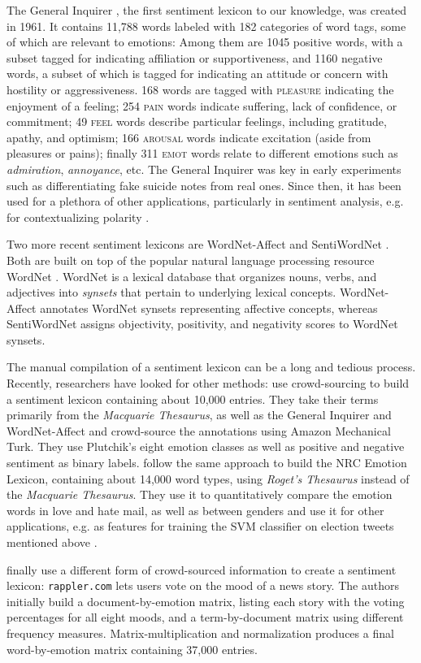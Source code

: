 The General Inquirer \cite{general_inquirer}, the first sentiment lexicon to our knowledge, was created in 1961. It contains 11,788 words labeled with 182 categories of word tags, some of which are relevant to emotions: Among them are 1045 positive words, with a subset tagged for indicating affiliation or supportiveness, and 1160 negative words, a subset of which is tagged for indicating an attitude or concern with hostility or aggressiveness. 168 words are tagged with \textsc{pleasure} indicating the enjoyment of a feeling; 254 \textsc{pain} words indicate suffering, lack of confidence, or commitment; 49 \textsc{feel} words describe particular feelings, including gratitude, apathy, and optimism; 166 \textsc{arousal} words indicate excitation (aside from pleasures or pains); finally 311 \textsc{emot} words relate to different emotions such as \textit{admiration}, \textit{annoyance}, etc. The General Inquirer was key in early experiments such as differentiating fake suicide notes from real ones. Since then, it has been used for a plethora of other applications, particularly in sentiment analysis, e.g. for contextualizing polarity \cite{general_inquirer_usage}. 

Two more recent sentiment lexicons are WordNet-Affect \cite{wordnet-affect} and SentiWordNet \cite{sentiwordnet}. Both are built on top of the popular natural language processing resource WordNet \cite{wordnet}. WordNet is a lexical database that organizes nouns, verbs, and adjectives into \textit{synsets} that pertain to underlying lexical concepts. WordNet-Affect annotates WordNet synsets representing affective concepts, whereas SentiWordNet assigns objectivity, positivity, and negativity scores to WordNet synsets.

The manual compilation of a sentiment lexicon can be a long and tedious process. Recently, researchers have looked for other methods: \citeauthor{nrc} use crowd-sourcing to build a sentiment lexicon containing about 10,000 entries. They take their terms primarily from the \textit{Macquarie Thesaurus}, as well as the General Inquirer and WordNet-Affect and crowd-source the annotations using Amazon Mechanical Turk. They use Plutchik's eight emotion classes as well as positive and negative sentiment as binary labels. \citeauthor{nrc_emolex} follow the same approach to build the NRC Emotion Lexicon, containing about 14,000 word types, using \textit{Roget's Thesaurus} instead of the \textit{Macquarie Thesaurus}. They use it to quantitatively compare the emotion words in love and hate mail, as well as between genders and use it for other applications, e.g. as features for training the SVM classifier on election tweets mentioned above \cite{semantic_role_labeling_tweets}.

\citeauthor{depechemood} finally use a different form of crowd-sourced information to create a sentiment lexicon: \texttt{rappler.com} lets users  vote on the mood of a news story. The authors initially build a document-by-emotion matrix, listing each story with the voting percentages for all eight moods, and a term-by-document matrix using different frequency measures. Matrix-multiplication and normalization produces a final word-by-emotion matrix containing 37,000 entries.
